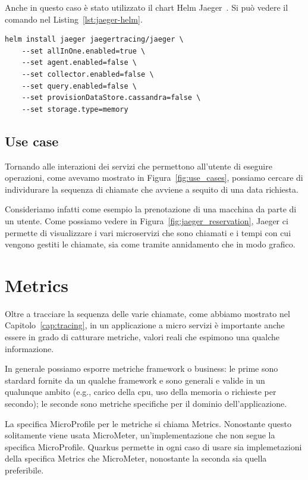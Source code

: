 Anche in questo caso è stato utilizzato il chart Helm Jaeger~\cite{jaeger_helm}. Si può vedere il comando nel Listing~\ref{lst:jaeger-helm}.
\begin{lstlisting}[caption=Install Jaeger chart for \textit{users-service}, label=lst:jaeger-helm]
helm install jaeger jaegertracing/jaeger \
    --set allInOne.enabled=true \
    --set agent.enabled=false \
    --set collector.enabled=false \
    --set query.enabled=false \
    --set provisionDataStore.cassandra=false \
    --set storage.type=memory
\end{lstlisting}

\subsection{Use case}
Tornando alle interazioni dei servizi che permettono all'utente di eseguire operazioni, come avevamo mostrato in Figura~\ref{fig:use_cases}, possiamo cercare di individurare la sequenza di chiamate che avviene a sequito di una data richiesta.

Consideriamo infatti come esempio la prenotazione di una macchina da parte di un utente. Come possiamo vedere in Figura~\ref{fig:jaeger_reservation}, Jaeger ci permette di visualizzare i vari microservizi che sono chiamati e i tempi con cui vengono gestiti le chiamate, sia come tramite annidamento che in modo grafico.

\section{Metrics}
Oltre a tracciare la sequenza delle varie chiamate, come abbiamo mostrato nel Capitolo~\ref{cap:tracing}, in un applicazione a micro servizi è importante anche essere in grado di catturare metriche, valori reali che espimono una qualche informazione.

In generale possiamo esporre metriche framework o business: le prime sono stardard fornite da un qualche framework e sono generali e valide in un qualunque ambito (e.g., carico della cpu, uso della memoria o richieste per secondo); le seconde sono metriche specifiche per il dominio dell'applicazione.

\myskip

La specifica MicroProfile per le metriche si chiama Metrics. Nonostante questo solitamente viene usata MicroMeter, un'implementazione che non segue la specifica MicroProfile. Quarkus permette in ogni caso di usare sia implemetazioni della specifica Metrics che MicroMeter, nonostante la seconda sia quella preferibile.

